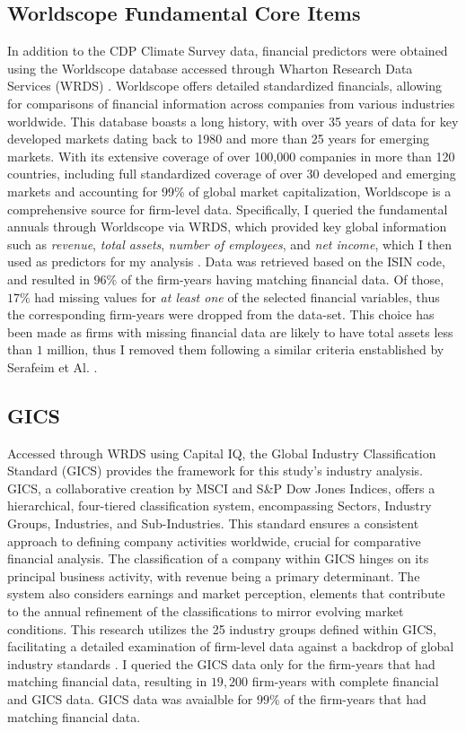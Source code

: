 \subsection{Worldscope Fundamental Core Items}
In addition to the CDP Climate Survey data, financial predictors were obtained using the Worldscope database \cite{Worldscope_2} accessed through Wharton Research Data Services (WRDS) \cite{WRDS}. Worldscope offers detailed standardized financials, allowing for comparisons of financial information across companies from various industries worldwide. This database boasts a long history, with over 35 years of data for key developed markets dating back to 1980 and more than 25 years for emerging markets. With its extensive coverage of over 100,000 companies in more than 120 countries, including full standardized coverage of over 30 developed and emerging markets and accounting for 99\% of global market capitalization, Worldscope is a comprehensive source for firm-level data. Specifically, I queried the fundamental annuals through Worldscope via WRDS, which provided key global information such as \textit{revenue}, \textit{total assets}, \textit{number of employees}, and \textit{net income}, which I then used as predictors for my analysis \cite{Worldscope_2}. Data was retrieved based on the ISIN code, and resulted in $96\%$ of the firm-years having matching financial data. Of those, $17\%$ had missing values for \textit{at least one} of the selected financial variables, thus the corresponding firm-years were dropped from the data-set. This choice has been made as firms with missing financial data are likely to have total assets less than $1$ million, thus I removed them following a similar criteria enstablished by Serafeim et Al. \cite{Serafeim2019}.

 \subsection{GICS}
 Accessed through WRDS using Capital IQ, the Global Industry Classification Standard (GICS) provides the framework for this study's industry analysis. GICS, a collaborative creation by MSCI and S\&P Dow Jones Indices, offers a hierarchical, four-tiered classification system, encompassing Sectors, Industry Groups, Industries, and Sub-Industries. This standard ensures a consistent approach to defining company activities worldwide, crucial for comparative financial analysis. The classification of a company within GICS hinges on its principal business activity, with revenue being a primary determinant. The system also considers earnings and market perception, elements that contribute to the annual refinement of the classifications to mirror evolving market conditions. This research utilizes the 25 industry groups defined within GICS, facilitating a detailed examination of firm-level data against a backdrop of global industry standards \cite{GICS_MSCI, GICS_Wikipedia}. I queried the GICS data only for the firm-years that had matching financial data, resulting in $19,200$ firm-years with complete financial and GICS data. GICS data was avaialble for $99\%$ of the firm-years that had matching financial data.
 
